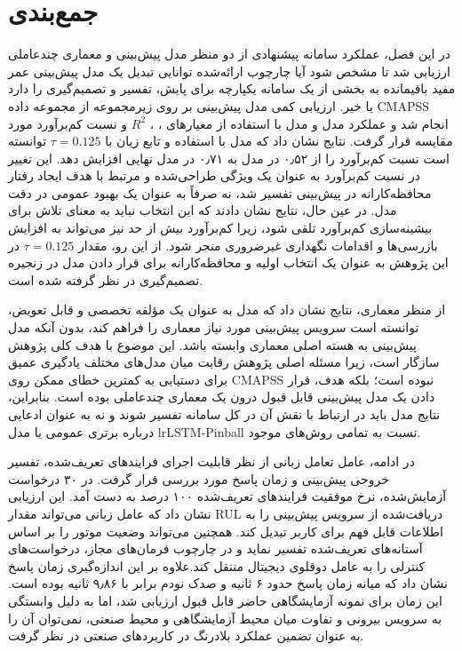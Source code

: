 \section{جمع‌بندی}
\label{sec:chapter5-summary}
در این فصل، عملکرد سامانه پیشنهادی از دو منظر مدل پیش‌بینی و معماری چندعاملی ارزیابی شد تا مشخص شود آیا چارچوب ارائه‌شده توانایی تبدیل یک مدل پیش‌بینی عمر مفید باقیمانده به بخشی از یک سامانه یکپارچه برای پایش، تفسیر و تصمیم‌گیری را دارد یا خیر. ارزیابی کمی مدل پیش‌بینی بر روی زیرمجموعه  از مجموعه داده \gls{CMAPSS} انجام شد و عملکرد مدل  و مدل  با استفاده از معیارهای ، ، $R^2$ و نسبت کم‌برآورد مورد مقایسه قرار گرفت. نتایج نشان داد که مدل  با استفاده و تابع زیان  با $\tau=0.125$ توانسته است نسبت کم‌برآورد را از ۰٫۵۲ در مدل  به ۰٫۷۱ در مدل نهایی افزایش دهد. این تغییر در نسبت کم‌برآورد به عنوان یک ویژگی طراحی‌شده و مرتبط با هدف ایجاد رفتار محافظه‌کارانه در پیش‌بینی تفسیر شد، نه صرفاً به عنوان یک بهبود عمومی در دقت مدل. در عین حال، نتایج نشان دادند که این انتخاب نباید به معنای تلاش برای بیشینه‌سازی کم‌برآورد تلقی شود، زیرا کم‌برآورد بیش از حد نیز می‌تواند به افزایش بازرسی‌ها و اقدامات نگهداری غیرضروری منجر شود. از این رو، مقدار $\tau=0.125$ در این پژوهش به عنوان یک انتخاب اولیه و محافظه‌کارانه برای قرار دادن مدل در زنجیره تصمیم‌گیری در نظر گرفته شده است.

از منظر معماری، نتایج نشان داد که مدل  به عنوان یک مؤلفه تخصصی و قابل تعویض، توانسته است سرویس پیش‌بینی مورد نیاز معماری را فراهم کند، بدون آنکه مدل پیش‌بینی به هسته اصلی معماری وابسته باشد. این موضوع با هدف کلی پژوهش سازگار است، زیرا مسئله اصلی پژوهش رقابت میان مدل‌های مختلف یادگیری عمیق برای دستیابی به کمترین خطای ممکن روی \gls{CMAPSS} نبوده است؛ بلکه هدف، قرار دادن یک مدل پیش‌بینی قابل قبول درون یک معماری چندعاملی بوده است. بنابراین، نتایج مدل باید در ارتباط با نقش آن در کل سامانه تفسیر شوند و نه به عنوان ادعایی درباره برتری عمومی  یا مدل lr{LSTM-Pinball} نسبت به تمامی روش‌های موجود.

در ادامه، عامل تعامل زبانی از نظر قابلیت اجرای فرایندهای تعریف‌شده، تفسیر خروجی پیش‌بینی و زمان پاسخ مورد بررسی قرار گرفت. در ۳۰ درخواست آزمایش‌شده، نرخ موفقیت فرایندهای تعریف‌شده ۱۰۰ درصد به دست آمد. این ارزیابی نشان داد که عامل زبانی می‌تواند مقدار \gls{RUL} دریافت‌شده از سرویس پیش‌بینی را به اطلاعات قابل فهم برای کاربر تبدیل کند. همچنین می‌تواند وضعیت موتور را بر اساس آستانه‌های تعریف‌شده تفسیر نماید و در چارچوب فرمان‌های مجاز، درخواست‌های کنترلی را به عامل دوقلوی دیجیتال منتقل کند.علاوه‌ بر این اندازه‌گیری زمان پاسخ نشان داد که میانه زمان پاسخ حدود ۶ ثانیه و صدک نودم برابر با ۹٫۸۶ ثانیه بوده است. این زمان برای نمونه آزمایشگاهی حاضر قابل قبول ارزیابی شد، اما به دلیل وابستگی به سرویس بیرونی و تفاوت میان محیط آزمایشگاهی و محیط صنعتی، نمی‌توان آن را به عنوان تضمین عملکرد بلادرنگ در کاربردهای صنعتی در نظر گرفت.

